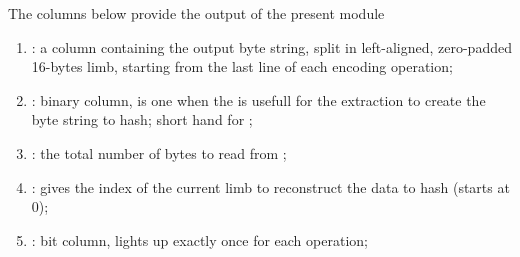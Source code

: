 The columns below provide the output of the present module
\begin{enumerate}[resume]
	\item \limb{}:
		a column containing the output byte string, split in left-aligned, zero-padded 16-bytes limb, starting from the last line of each encoding operation;
	\item \lc{}:
		binary column, is one when the \limb{} is usefull for the extraction to create the byte string to hash;
		short hand for ;
	\item \limbsize{}:
		the total number of bytes to read from \limb{};
	\item \index{}:
		gives the index of the current limb to reconstruct the data to hash (starts at 0);
	\item \selectorKeccakRes{}:
		bit column, lights up exactly once for each operation;
\end{enumerate}

